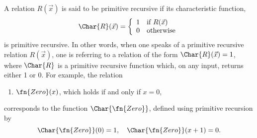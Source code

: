 \documentclass[../../include/open-logic-section]{subfiles}
\begin{document}
A relation $R(\vec x)$ is said to be primitive recursive if its characteristic
function,
\[
\Char{R}(\vec x) = \left\{
  \begin{array}{ll}
  1 & \mbox{if $R(\vec x)$} \\
  0 & \mbox{otherwise} 
  \end{array}
\right.
\]
is primitive recursive. In other words, when one speaks of a primitive
recursive relation $R(\vec x)$, one is referring to a relation of the
form $\Char{R}(\vec x) = 1$, where $\Char{R}$ is a primitive recursive
function which, on any input, returns either 1 or 0. For example, the
relation
\begin{enumerate}
\item $\fn{Zero}(x)$, which holds if and only if $x = 0$,
\end{enumerate}
corresponds to the function $\Char{\fn{Zero}}$, defined using primitive
recursion by 
\[
\Char{\fn{Zero}}(0) = 1, \quad \Char{\fn{Zero}}(x+1) = 0.
\]
\end{document}
